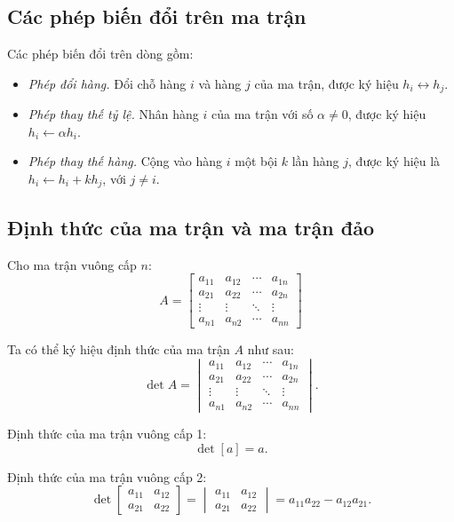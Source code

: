 \documentclass[12pt,a4paper]{report}
\begin{document}
\subsection{Các phép biến đổi trên ma trận}

 Các phép biến đổi trên dòng gồm:
\begin{itemize}
\item \textit{Phép đổi hàng.} Đổi chỗ hàng $i$ và hàng $j$ của ma trận, được ký hiệu $h_i \leftrightarrow h_j$.
\item \textit{Phép thay thế tỷ lệ.} Nhân hàng $i$ của ma trận với số $\alpha \neq 0$, được ký hiệu $h_i \leftarrow \alpha h_i$.
\item \textit{Phép thay thế hàng.} Cộng vào hàng $i$ một bội $k$ lần hàng $j$, được ký hiệu là $h_i \leftarrow h_i + k h_j$, với $j \neq i$.
\end{itemize}


\subsection{ Định thức của ma trận và ma trận đảo}
Cho ma trận vuông cấp $n$:
\begin{equation*}
A =
\begin{bmatrix}
	a_{11} & a_{12} & \cdots & a_{1n} \\
	a_{21} & a_{22} & \cdots & a_{2n} \\
	\vdots & \vdots & \ddots & \vdots \\
	a_{n1} & a_{n2} & \cdots & a_{nn} 
\end{bmatrix}
\end{equation*}

 Ta có thể ký hiệu định thức của ma trận $A$ như sau:
\begin{equation*}
\det A =
\begin{vmatrix}
	a_{11} & a_{12} & \cdots & a_{1n} \\
	a_{21} & a_{22} & \cdots & a_{2n} \\
	\vdots & \vdots & \ddots & \vdots \\
	a_{n1} & a_{n2} & \cdots & a_{nn} 
\end{vmatrix}.
\end{equation*}

Định thức của ma trận vuông cấp 1:
\begin{equation}
\det[a]=a.
\end{equation}

Định thức của ma trận vuông cấp 2:
\begin{equation}
\det \begin{bmatrix}
a_{11} & a_{12} \\
a_{21} & a_{22}
\end{bmatrix} = \begin{vmatrix}
a_{11} & a_{12} \\
a_{21} & a_{22}
\end{vmatrix} = a_{11}a_{22} - a_{12}a_{21}.
\end{equation}
\end{document}
